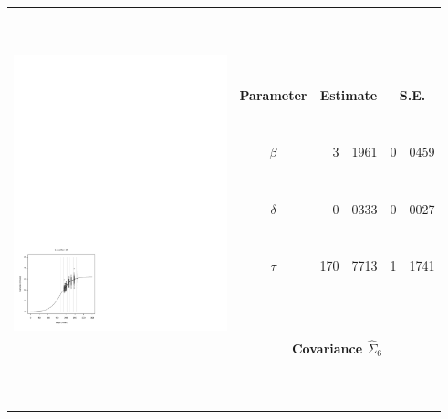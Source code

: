 


		\begin{tabular}{ccr@{.}lr@{.}l}
		\hline
		\hline
		 & &  \multicolumn{2}{c}{\ } & \multicolumn{2}{c}{\ } \\
		  & &  \multicolumn{2}{c}{\ } & \multicolumn{2}{c}{\ } \\
		 \multirow{10}{*}{ \includegraphics[height=80mm]{graphics/location_6.pdf}} &  \multicolumn{2}{c}{\ } & \multicolumn{2}{c}{\ } \\
		 & {\bf{Parameter}} & \multicolumn{2}{c}{{\bf{Estimate}}} & \multicolumn{2}{c}{{\bf{S.E.}}}  \\
		\cline{2-6}
		 & &  \multicolumn{2}{c}{\ } & \multicolumn{2}{c}{\ } \\
		& {\bf{$\beta$}} &	  3&1961		& 0&0459		\\
		 & &  \multicolumn{2}{c}{\ } & \multicolumn{2}{c}{\ } \\
		& {\bf{$\delta$}} &	  0&0333		& 0&0027		 \\
		 & &  \multicolumn{2}{c}{\ } & \multicolumn{2}{c}{\ } \\
		& {\bf{$\tau$}}	&	170&7713		& 1&1741		 \\
		 & &  \multicolumn{2}{c}{\ } & \multicolumn{2}{c}{\ } \\
		 & &  \multicolumn{2}{c}{\ } & \multicolumn{2}{c}{\ } \\
		 & \multicolumn{5}{c}{\bf{Covariance} $\hat{\Sigma}_6$ } \\
		\cline{2-6}
		& \multicolumn{5}{c}{ } \\
		 & &  \multicolumn{2}{c}{\ } & \multicolumn{2}{c}{\ } \\
		  & &  \multicolumn{2}{c}{\ } & \multicolumn{2}{c}{\ } \\
		 \hline
		\hline
		\end{tabular}



